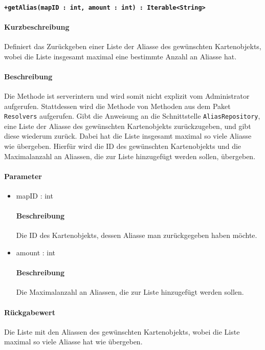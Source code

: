 \paragraph*{\texttt{+getAlias(mapID : int, amount : int) : Iterable<String>}}%
\paragraph*{Kurzbeschreibung}
Definiert das Zurückgeben einer Liste der Aliasse des gewünschten Kartenobjekts, wobei die Liste insgesamt maximal eine bestimmte Anzahl an Aliasse hat.
\paragraph*{Beschreibung}
Die Methode ist serverintern und wird somit nicht explizit vom Administrator aufgerufen.
Stattdessen wird die Methode von Methoden aus dem Paket \texttt{Resolvers} aufgerufen.
Gibt die Anweisung an die Schnittstelle \texttt{AliasRepository}, eine Liste der Aliasse des gewünschten Kartenobjekts zurückzugeben, und gibt diese wiederum zurück.
Dabei hat die Liste insgesamt maximal so viele Aliasse wie übergeben.
Hierfür wird die ID des gewünschten Kartenobjekts und die Maximalanzahl an Aliassen, die zur Liste hinzugefügt werden sollen, übergeben.
\paragraph*{Parameter}
\begin{itemize}
    \item mapID : int
    		\paragraph*{Beschreibung}
    		Die ID des Kartenobjekts, dessen Aliasse man zurückgegeben haben möchte.
    	\item amount : int
    		\paragraph*{Beschreibung}
    		Die Maximalanzahl an Aliassen, die zur Liste hinzugefügt werden sollen.
\end{itemize}
\paragraph*{Rückgabewert}
Die Liste mit den Aliassen des gewünschten Kartenobjekts, wobei die Liste maximal so viele Aliasse hat wie übergeben.
